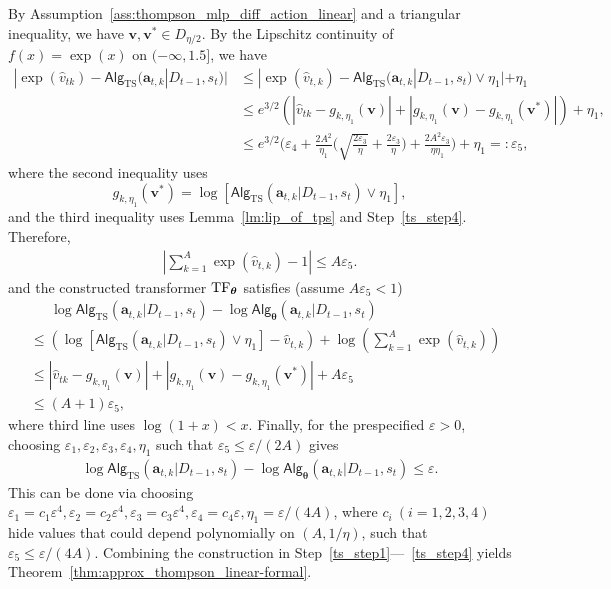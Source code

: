 \documentclass[10pt]{article}
\renewcommand{\hat}{\widehat}
\newcommand{\eps}{\varepsilon}
\newcommand{\<}{\left\langle}
\renewcommand{\>}{\right\rangle}
\newcommand{\TF}{{\rm TF}}
\newcommand{\TS}{{\mathrm{TS}}}
\newcommand{\trunprob}{{\eta_1}}
\newcommand{\Trunreg}{{D}}
\newcommand{\Trunregp}{{\eta}}
\newcommand{\bigvec}{{\mathbf{v}}}
\newcommand{\state}{{s}}
\newcommand{\sAlg}{{\mathsf{Alg}}}
\newcommand{\dset}{{D}}
\newcommand{\tfpar}{{\btheta}}
\def\btheta{{\boldsymbol \theta}}
\def\ba{{\mathbf a}}
\begin{document}
By Assumption~\ref{ass:thompson_mlp_diff_action_linear} and a triangular inequality,  we have $\bigvec,\bigvec^*\in\Trunreg_{\Trunregp/2}$.
 By the Lipschitz continuity of $f(x)=\exp(x)$ on $(-\infty,1.5]$, we have
\begin{align*}
|\exp(\hat v_{tk})- \sAlg_{\TS}(\ba_{t,k}|\dset_{t-1},\state_t)|&\leq|\exp(\hat v_{t,k})- \sAlg_{\TS}(\ba_{t,k}|\dset_{t-1},\state_t)\vee\trunprob|+\trunprob \\
&
\leq e^{3/2}(|\hat v_{tk}-g_{k,\trunprob}(\bigvec)|+|g_{k,\trunprob}(\bigvec)-g_{k,\trunprob}(\bigvec^*)|)+\trunprob,\\
&\leq
e^{3/2}\Big(\eps_4+\frac{2A^2}{\trunprob}\Big(\sqrt{\frac{2\eps_3}{\Trunregp}}+\frac{2\eps_3}{\Trunregp}\Big)+\frac{2A^2\eps_3}{\Trunregp\trunprob}\Big)+\trunprob=:\eps_5,
\end{align*}
where the second inequality uses
$$g_{k,\trunprob}(\bigvec^*)=\log[\sAlg_{\TS}(\ba_{t,k}|\dset_{t-1},\state_t)\vee\trunprob],$$ and the
third inequality uses Lemma~\ref{lm:lip_of_tps} and Step~\ref{ts_step4}. Therefore,
\begin{align*}
 |\sum_{k=1}^A \exp(\hat v_{t,k})-1|\leq A\eps_5.
\end{align*}
and the constructed transformer $\TF_\tfpar$ satisfies (assume $A\eps_5<1$)
\begin{align*}
&\quad~~ \log\sAlg_{\TS}(\ba_{t,k}|\dset_{t-1},\state_t)-\log\sAlg_{\tfpar}(\ba_{t,k}|\dset_{t-1},\state_t)\\
&\leq (\log[\sAlg_{\TS}(\ba_{t,k}|\dset_{t-1},\state_t)\vee\trunprob]-\hat v_{t,k}
)+
\log(\sum_{k=1}^A\exp({\hat v}_{t,k}))\\
&\leq
|\hat v_{tk}-g_{k,\trunprob}(\bigvec)|+|g_{k,\trunprob}(\bigvec)-g_{k,\trunprob}(\bigvec^*)|+A\eps_5
\\
&\leq (A+1)\eps_5,
\end{align*}
where third line uses $\log(1+x)<x$.
Finally, for the prespecified $\eps>0$,  choosing $\eps_1,\eps_2,\eps_3,\eps_4,\trunprob$ such that $\eps_5\leq\eps/(2A)$ gives
\begin{align*}
\log\sAlg_{\TS}(\ba_{t,k}|\dset_{t-1},\state_t)-\log\sAlg_{\tfpar}(\ba_{t,k}|\dset_{t-1},\state_t)\leq\eps.
\end{align*}
 This can be done via choosing $\eps_1= c_1\eps^4,\eps_2=c_2\eps^4,\eps_3=c_3\eps^4,\eps_4=c_4\eps,\trunprob=\eps/(4A)$, where $c_i~(i=1,2,3,4)$  hide values that could depend polynomially on $(A,1/\Trunregp)$, such that $\eps_5\leq\eps/(4A)$.
 Combining the construction in  Step~\ref{ts_step1}---~\ref{ts_step4} yields Theorem~\ref{thm:approx_thompson_linear-formal}.
\end{document}
